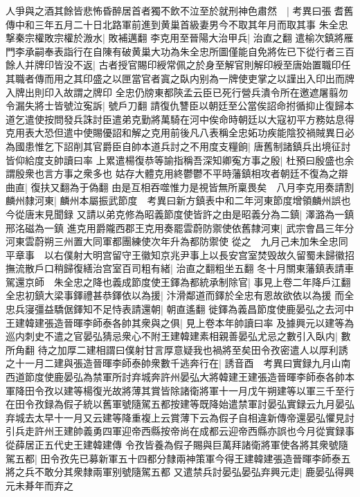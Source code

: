 人爭與之酒其餘皆悲怖昏醉居首者獨不飲不泣至於就刑神色肅然　|{
	考異曰張耆舊傳中和三年五月二十日北路軍前進到黄巢首級妻男今不取其年月而取其事}
朱全忠撃秦宗權敗宗權於溵水|{
	敗補邁翻}
李克用至晉陽大治甲兵|{
	治直之翻}
遣榆次鎮將雁門李承嗣奉表詣行在自陳有破黄巢大功為朱全忠所圖僅能自免將佐已下從行者三百餘人并牌印皆没不返|{
	古者授官賜印綬常佩之於身至解官則解印綬至唐始置職印任其職者傳而用之其印盛之以匣當官者寘之臥内别為一牌使吏掌之以謹出入印出而牌入牌出則印入故謂之牌印}
全忠仍牓東都陝孟云臣已死行營兵潰令所在邀遮屠翦勿令漏失將士皆號泣寃訴|{
	號戶刀翻}
請復仇讐臣以朝廷至公當俟詔命拊循抑止復歸本道乞遣使按問發兵誅討臣遣弟克勤將萬騎在河中俟命時朝廷以大寇初平方務姑息得克用表大恐但遣中使賜優詔和解之克用前後凡八表稱全忠妬功疾能陰狡禍賊異日必為國患惟乞下詔削其官爵臣自帥本道兵討之不用度支糧餉|{
	唐舊制諸鎮兵出境征討皆仰給度支帥讀曰率}
上累遣楊復恭等諭指稱吾深知卿寃方事之殷|{
	杜預曰殷盛也余謂殷衆也言方事之衆多也}
姑存大體克用終鬱鬱不平時藩鎮相攻者朝廷不復為之辯曲直|{
	復扶又翻為于偽翻}
由是互相吞噬惟力是視皆無所稟畏矣　八月李克用奏請割麟州隸河東|{
	麟州本屬振武節度　考異曰新方鎮表中和二年河東節度增領麟州誤也今從唐末見聞録}
又請以弟克修為昭義節度使皆許之由是昭義分為二鎮|{
	澤潞為一鎮邢洺磁為一鎮}
進克用爵隴西郡王克用奏罷雲蔚防禦使依舊隸河東|{
	武宗會昌三年分河東雲蔚朔三州置大同軍都團練使次年升為都防禦使}
從之　九月己未加朱全忠同平章事　以右僕射大明宫留守王徽知京兆尹事上以長安宫室焚毁故久留蜀未歸徽招撫流散戶口稍歸復繕治宫室百司粗有緒|{
	治直之翻粗坐五翻}
冬十月關東藩鎮表請車駕還京師　朱全忠之降也義成節度使王鐸為都統承制除官|{
	事見上卷二年降戶江翻}
全忠初鎮大梁事鐸禮甚恭鐸依以為援|{
	汴滑鄰道而鐸於全忠有恩故欲依以為援}
而全忠兵寖彊益驕倨鐸知不足恃表請還朝|{
	朝直遙翻}
徙鐸為義昌節度使鹿晏弘之去河中王建韓建張造晉暉李師泰各帥其衆與之俱|{
	見上卷本年帥讀曰率}
及據興元以建等為巡内刺史不遣之官晏弘猜忌衆心不附王建韓建素相親善晏弘尤忌之數引入臥内|{
	數所角翻}
待之加厚二建相謂曰僕射甘言厚意疑我也禍將至矣田令孜密遣人以厚利誘之十一月二建與張造晉暉李師泰帥衆數千逃奔行在|{
	誘音酉　考異曰實録九月山南西道節度使鹿晏弘為禁軍所討弃城奔許州晏弘大將韓建王建張造晉暉李師泰各帥本軍降田令孜以建等楊復光故將薄其賞皆除諸衛將軍十一月戊午朔建等以軍三千至行在田令孜録為假子統以舊軍號隨駕五都按建等既降始遣禁軍討晏弘實録云九月晏弘弃城去太早十一月又云建等降重複上云賞薄下云為假子自相違新傳帝還晏弘懼見討引兵走許州王建帥義勇四軍迎帝西縣按帝尚在成都云迎帝西縣亦誤也今月從實録事從薛居正五代史王建韓建傳}
令孜皆養為假子賜與巨萬拜諸衛將軍使各將其衆號隨駕五都|{
	田令孜先已募新軍五十四都分隸兩神策軍今得王建韓建張造晉暉李師泰五將之兵不敢分其衆隸兩軍别號隨駕五都}
又遣禁兵討晏弘晏弘弃興元走|{
	鹿晏弘得興元未朞年而弃之}
